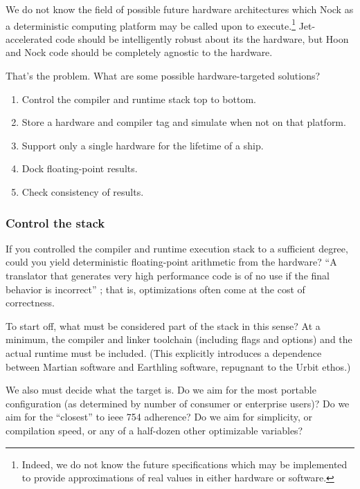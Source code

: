 \documentclass[twoside]{article}
\begin{document}
We do not know the field of possible future hardware architectures which Nock as a deterministic computing platform may be called upon to execute.\footnote{Indeed, we do not know the future specifications which may be implemented to provide approximations of real values in either hardware or software.}  Jet-accelerated code should be intelligently robust about its the hardware, but Hoon and Nock code should be completely agnostic to the hardware.

That's the problem.  What are some possible hardware-targeted solutions?

\begin{enumerate}
  \item  Control the compiler and runtime stack top to bottom.
  \item  Store a hardware and compiler tag and simulate when not on that platform.
  \item  Support only a single hardware for the lifetime of a ship.
  \item  Dock floating-point results.
  \item  Check consistency of results.
\end{enumerate}

\subsubsection{Control the stack}

If you controlled the compiler and runtime execution stack to a sufficient degree, could you yield deterministic floating-point arithmetic from the hardware?  “A translator that generates very high performance code is of no use if the final behavior is incorrect” \citetext{\citet{Jones2008}, p.~189}; that is, optimizations often come at the cost of correctness.

To start off, what must be considered part of the stack in this sense?  At a minimum, the compiler and linker toolchain (including flags and options) and the actual runtime must be included.  (This explicitly introduces a dependence between Martian software and Earthling software, repugnant to the Urbit ethos.)

We also must decide what the target is.  Do we aim for the most portable configuration (as determined by number of consumer or enterprise users)?  Do we aim for the “closest” to {\sc ieee} 754 adherence?  Do we aim for simplicity, or compilation speed, or any of a half-dozen other optimizable variables?
\end{document}
